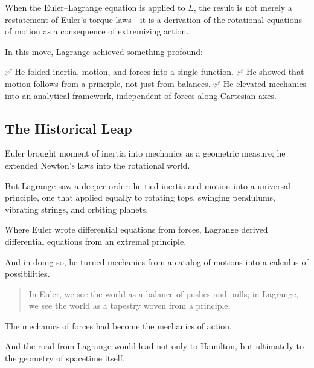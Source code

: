 When the Euler–Lagrange equation is applied to \( L \), the result is not merely a restatement of Euler’s torque laws—it is a derivation of the rotational equations of motion as a consequence of extremizing action.

In this move, Lagrange achieved something profound:

✅ He folded inertia, motion, and forces into a single function.  
✅ He showed that motion follows from a principle, not just from balances.  
✅ He elevated mechanics into an analytical framework, independent of forces along Cartesian axes.

\bigskip

\subsection*{The Historical Leap}

Euler brought moment of inertia into mechanics as a geometric measure;  
he extended Newton’s laws into the rotational world.

But Lagrange saw a deeper order:  
he tied inertia and motion into a universal principle, one that applied equally to rotating tops, swinging pendulums, vibrating strings, and orbiting planets.

Where Euler wrote differential equations from forces,  
Lagrange derived differential equations from an extremal principle.

And in doing so, he turned mechanics from a catalog of motions into a calculus of possibilities.

\bigskip

\begin{quote}
In Euler, we see the world as a balance of pushes and pulls;  
in Lagrange, we see the world as a tapestry woven from a principle.
\end{quote}

The mechanics of forces had become the mechanics of action.

And the road from Lagrange would lead not only to Hamilton, but ultimately to the geometry of spacetime itself.
